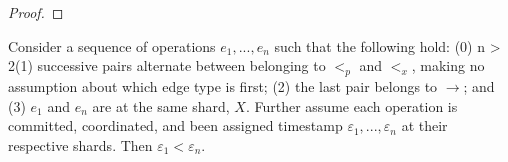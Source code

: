 \begin{proof}



\end{proof}

\begin{lem}
\label{lemma3}
Consider a sequence of operations $e_1,...,e_n$ such that the following hold: (0) n > 2(1) successive pairs alternate between belonging to $<_p$ and $<_x$, making no assumption about which edge type is first; (2) the last pair belongs to $\rightarrow$; and (3) $e_1$ and $e_n$ are at the same shard, $X$. Further assume each operation is committed, coordinated, and been assigned timestamp $\varepsilon_1, ..., \varepsilon_n$ at their respective shards. Then $\varepsilon_1 < \varepsilon_n$.
\end{lem}

